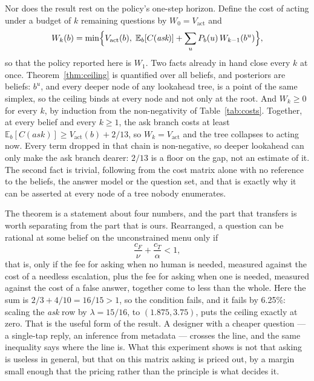 \documentclass{article}
\begin{document}
Nor does the result rest on the policy's one-step horizon. Define the cost of
acting under a budget of $k$ remaining questions by $W_0 = V_{\mathrm{act}}$ and
\begin{equation}
W_k(b) = \min\Bigl\{ V_{\mathrm{act}}(b),\;
  \mathbb{E}_b[C(\textit{ask})] + \sum_u P_b(u)\, W_{k-1}(b^u) \Bigr\} ,
\end{equation}
so that the policy reported here is $W_1$. Two facts already in hand close every
$k$ at once. Theorem~\ref{thm:ceiling} is quantified over all beliefs, and
posteriors are beliefs: $b^u$, and every deeper node of any lookahead tree, is a
point of the same simplex, so the ceiling binds at every node and not only at the
root. And $W_k \ge 0$ for every $k$, by induction from the non-negativity of
Table~\ref{tab:costs}. Together, at every belief and every $k \ge 1$, the ask
branch costs at least $\mathbb{E}_b[C(\textit{ask})] \ge V_{\mathrm{act}}(b) +
2/13$, so $W_k = V_{\mathrm{act}}$ and the tree collapses to acting now. Every
term dropped in that chain is non-negative, so deeper lookahead can only make the
ask branch dearer: $2/13$ is a floor on the gap, not an estimate of it. The second
fact is trivial, following from the cost matrix alone with no reference to the
beliefs, the answer model or the question set, and that is exactly why it can be
asserted at every node of a tree nobody enumerates.

The theorem is a statement about four numbers, and the part that transfers is
worth separating from the part that is ours. Rearranged, a question can be
rational at some belief on the unconstrained menu only if
\begin{equation}
\frac{c_F}{\nu} + \frac{c_T}{\alpha} < 1 ,
\end{equation}
that is, only if the fee for asking when no human is needed, measured against the
cost of a needless escalation, plus the fee for asking when one is needed, measured
against the cost of a false answer, together come to less than the whole. Here the
sum is $2/3 + 4/10 = 16/15 > 1$, so the condition fails, and it fails by 6.25\%:
scaling the \emph{ask} row by $\lambda = 15/16$, to $(1.875, 3.75)$, puts the
ceiling exactly at zero. That is the useful form of the result. A designer with a
cheaper question --- a single-tap reply, an inference from metadata --- crosses the
line, and the same inequality says where the line is. What this experiment shows is
not that asking is useless in general, but that on this matrix asking is priced
out, by a margin small enough that the pricing rather than the principle is what
decides it.
\end{document}
